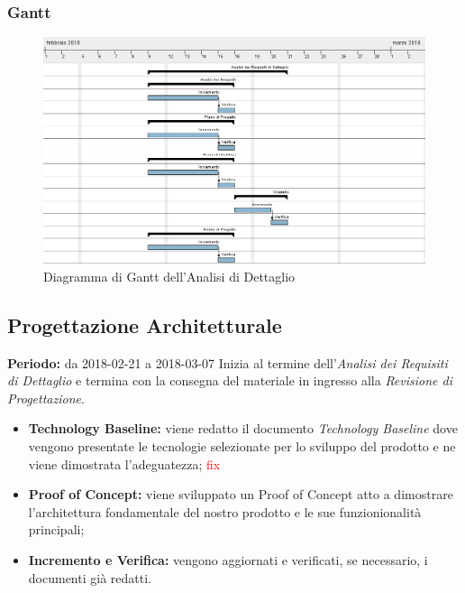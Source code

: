\subsubsection{Gantt}
\begin{figure}[H]
	\centering 
	\includegraphics[width=1\textwidth]{images/Analisi-Dettaglio.png}
	\caption{Diagramma di Gantt dell'Analisi di Dettaglio}
	\label{graficobello2} 
\end{figure}
\subsection{Progettazione Architetturale}
    \textbf{Periodo:} da 2018-02-21 a 2018-03-07 \Spazio
    Inizia al termine dell'\emph{Analisi dei Requisiti di Dettaglio} e termina con la consegna del materiale in ingresso alla \emph{Revisione di Progettazione}.
    \begin{itemize}
    	\item \textbf{Technology Baseline:} viene redatto il documento \emph{Technology Baseline } dove vengono presentate le tecnologie selezionate per lo sviluppo del prodotto e ne viene dimostrata l'adeguatezza;
    	\textcolor{red}{fix}
    	\item \textbf{Proof of Concept:} viene sviluppato un Proof of Concept atto a dimostrare l'architettura fondamentale del nostro prodotto e le sue funzionionalità principali;
    	\item \textbf{Incremento e Verifica:} vengono aggiornati e verificati, se necessario, i documenti già redatti.	
    \end{itemize}
